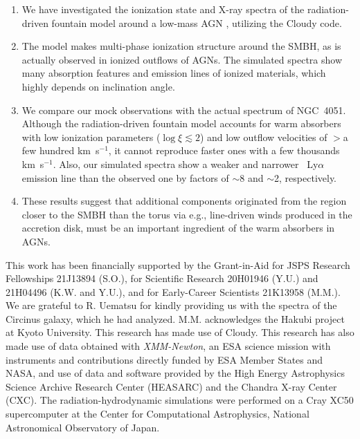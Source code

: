 \documentclass[twocolumn,times,twocolappendix]{aastex63}
\begin{document}
\begin{enumerate}

\item We have investigated the ionization state and X-ray spectra of
  the radiation-driven fountain model around a low-mass AGN
  \citep{Wada2016}, utilizing the \textsf{Cloudy} code.

\item The model makes multi-phase ionization structure around the
  SMBH, as is actually observed in ionized outflows of AGNs. The
  simulated spectra show many absorption features and emission lines
  of ionized materials, which highly depends on inclination angle.
  

\item 
  We compare our mock observations with the actual spectrum of NGC~4051. 
  Although the radiation-driven fountain model accounts for warm
  absorbers with low ionization parameters ($\log \xi \lesssim 2$) and
  low outflow velocities of $>$a few hundred km~s$^{-1}$, it cannot
  reproduce faster ones with a few thousands km~s$^{-1}$. Also, our
  simulated spectra show a weaker and narrower
  ~Ly$\alpha$ emission line
  than the observed one by factors of $\sim$8 and
  $\sim$2, respectively.

\item 
  These results suggest that additional components originated 
  from the region closer to the SMBH than the torus via e.g.,
  line-driven winds produced in the accretion disk, must be an important
  ingredient of the warm absorbers in AGNs.


\end{enumerate}

\acknowledgements 

This work has been financially supported by the Grant-in-Aid for JSPS
Research Fellowships 21J13894 (S.O.), for Scientific Research
20H01946 (Y.U.) and 21H04496 (K.W. and Y.U.), 
and for Early-Career Scientists 21K13958 (M.M.).
We are grateful to R. Uematsu for kindly providing
us with the spectra of the Circinus galaxy, which he had analyzed.
M.M. acknowledges the Hakubi project at Kyoto University.
This research has made use of \textsf{Cloudy}.  This research has also made use
of data obtained with \textit{XMM-Newton}, an ESA science mission with
instruments and contributions directly funded by ESA Member States and
NASA, and use of data and software provided by the High Energy
Astrophysics Science Archive Research Center (HEASARC) and the Chandra
X-ray Center (CXC).
The radiation-hydrodynamic simulations were performed on a Cray XC50 supercomputer at the Center for Computational Astrophysics, National Astronomical Observatory of Japan.
\end{document}
